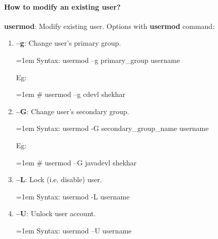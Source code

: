\begin{flushleft}
	\paragraph{How to modify an existing user?}
	\bigskip
	\textbf{usermod}: Modify existing user.
	\newline
	Options with \textbf{usermod} command:
	\begin{enumerate}[label=(\alph*)]
		\item \textbf{–g}: Change user's primary group.
		\bigskip
		\begin{tcolorbox}[breakable,notitle,boxrule=0pt,colback=pink,colframe=pink]
			\color{black}
			\font=1em
			Syntax: usermod –g primary\_group username
			\font=4pt
		\end{tcolorbox}
		Eg:
		\bigskip
		\begin{tcolorbox}[breakable,notitle,boxrule=-0pt,colback=black,colframe=black]
			\color{green}
			\font=1em
			\# usermod –g cdevl shekhar
			\font=4pt
		\end{tcolorbox}
		
		\item \textbf{–G}: Change user's secondary group.
		\bigskip
		\begin{tcolorbox}[breakable,notitle,boxrule=0pt,colback=pink,colframe=pink]
			\color{black}
			\font=1em
			Syntax: usermod -G secondary\_group\_name username
			\font=4pt
		\end{tcolorbox}
		Eg:
		\bigskip
		\begin{tcolorbox}[breakable,notitle,boxrule=-0pt,colback=black,colframe=black]
			\color{green}
			\font=1em
			\# usermod –G javadevl shekhar
			\font=4pt
		\end{tcolorbox}
		
		
		\item \textbf{–L}: Lock (i.e. disable) user.
		\bigskip
		\begin{tcolorbox}[breakable,notitle,boxrule=0pt,colback=pink,colframe=pink]
			\color{black}
			\font=1em
			Syntax: usermod -L username
			\font=4pt
		\end{tcolorbox}		
		
		\item \textbf{–U}: Unlock user account.
		\bigskip
		\begin{tcolorbox}[breakable,notitle,boxrule=0pt,colback=pink,colframe=pink]
			\color{black}
			\font=1em
			Syntax: usermod –U username
			\font=4pt
		\end{tcolorbox}
		

\end{enumerate}
\end{flushleft}
